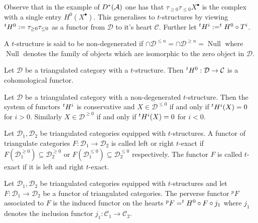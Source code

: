 Observe that in the example of $D^*(\AA)$ one has that $\tau_{\geq 0} \tau_{\leq 0} X^\bullet$ is the complex with a single entry $H^0(X^\bullet)$.
This generalises to $t$-structures by viewing $\tH^0:= \tau_{\geq 0}\tau_{\leq 0}$ as a functor from $\mathcal{D}$ to it's heart $\mathcal{C}$.
Further let $\tH^i:= \tH^0 \circ T^i$.
\begin{definition}
 A $t$-structure is said to be non-degenerated if $\cap \mathcal{D}^{\leq n} = \cap \mathcal{D}^{\geq n}= \operatorname{Null}$ where $\operatorname{Null}$ denotes the family of objects which are isomorphic to the zero object in $\mathcal{D}$.
\end{definition}
\begin{proposition}
 Let $\mathcal{D}$ be a triangulated category with a $t$-structure. Then $\tH^0:\mathcal{D}\to \mathcal{C}$ is a cohomological functor.
\end{proposition}
\begin{proposition}
 Let $\mathcal{D}$ be a triangulated category with a non-degenerated $t$-structure. Then the system of functors $\tH^i$ is conservative and $X\in \mathcal{D}^{\leq 0}$ if and only if $\tH^i(X) = 0$ for $i>0$. Similarly $X\in \mathcal{D}^{\geq 0}$ if and only if $\tH^i(X)= 0$ for $i<0$.
\end{proposition}
\begin{definition}
 Let $\mathcal{D}_1,\mathcal{D}_2$ be triangulated categories equipped with $t$-structures. A functor of triangulate categories $F:\mathcal{D}_1\to \mathcal{D}_2$ is called left or right $t$-exact if $F(\mathcal{D}_1^{\geq 0}) \subseteq \mathcal{D}_2^{\geq 0}$ or $F(\mathcal{D}_1^{\leq 0}) \subseteq \mathcal{D}_2^{\leq 0}$ respectively.
 The functor $F$ is called $t$-exact if it is left and right $t$-exact.
\end{definition}
\begin{definition}
 Let $\mathcal{D}_1,\mathcal{D}_2$ be triangulated categories equipped with $t$-structures and let $F:\mathcal{D}_1 \to \mathcal{D}_2$ be a functor of triangulated categories.
 The perverse functor $^pF$ associated to $F$ is the induced functor on the hearts $^pF = \tH^0 \circ F \circ j_1$ where $j_1$ denotes the inclusion functor $j_1:\mathcal{C}_1\to \mathcal{C}_2$.
\end{definition}
